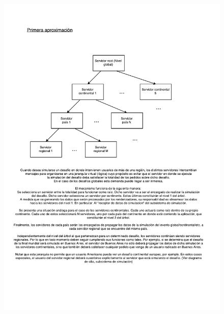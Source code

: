 \begin{figure}[H]
  \includegraphics[width=\textwidth, page=1, clip, trim=20 0 20 110]{imagenes/jerarquia-global.pdf}
\end{figure}
\newpage
